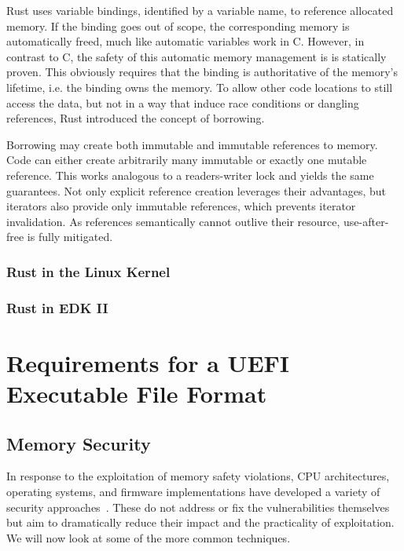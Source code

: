 Rust uses variable bindings, identified by a variable name, to reference allocated memory. If the binding goes out of scope, the corresponding memory is automatically freed, much like automatic variables work in C. However, in contrast to C, the safety of this automatic memory management is is statically proven. This obviously requires that the binding is authoritative of the memory's lifetime, i.e. the binding owns the memory. To allow other code locations to still access the data, but not in a way that induce race conditions or dangling references, Rust introduced the concept of borrowing.

Borrowing may create both immutable and immutable references to memory. Code can either create arbitrarily many immutable or exactly one mutable reference. This works analogous to a readers-writer lock and yields the same guarantees. Not only explicit reference creation leverages their advantages, but iterators also provide only immutable references, which prevents iterator invalidation. As references semantically cannot outlive their resource, use-after-free is fully mitigated.

\subsection{Rust in the Linux Kernel}

\subsection{Rust in EDK II}

\chapter{Requirements for a UEFI Executable File Format}
\label{chap:uefi_exec_reqs}

\section{Memory Security}

In response to the exploitation of memory safety violations, \gls{CPU} architectures, operating systems, and \gls{firmware} implementations have developed a variety of security approaches~\cite{10.1007/978-3-642-33338-5_5}. These do not address or fix the vulnerabilities themselves but aim to dramatically reduce their impact and the practicality of exploitation. We will now look at some of the more common techniques.

